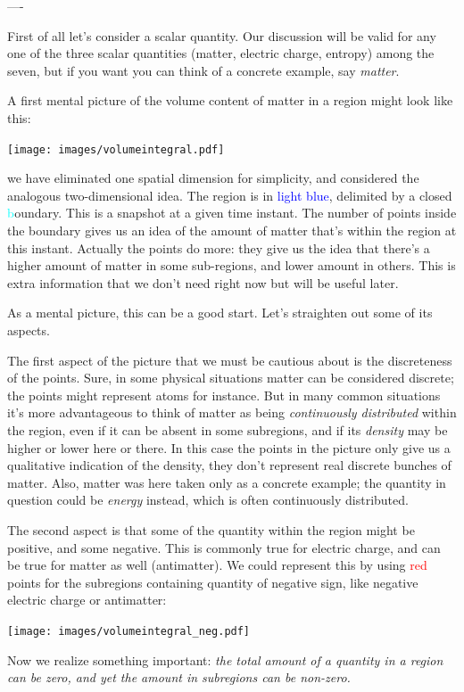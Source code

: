 ----



First of all let's consider a scalar quantity. Our discussion will be valid for any one of the three scalar quantities (matter, electric charge, entropy) among the seven, but if you want you can think of a concrete example, say \emph{matter}.

A first mental picture of the volume content of matter in a region might look like this:
\begin{center}
  \texttt{[image: images/volumeintegral.pdf]}
\end{center}
we have eliminated one spatial dimension for simplicity, and considered the analogous two-dimensional idea. The region is in \textcolor{blue}{light blue}, delimited by a closed \textcolor{cyan} boundary. This is a snapshot at a given time instant. The number of points inside the boundary gives us an idea of the amount of matter that's within the region at this instant. Actually the points do more: they give us the idea that there's a higher amount of matter in some sub-regions, and lower amount in others. This is extra information that we don't need right now but will be useful later.

As a mental picture, this can be a good start. Let's straighten out some of its aspects.

The first aspect of the picture that we must be cautious about is the discreteness of the points. Sure, in some physical situations matter can be considered discrete; the points might represent atoms for instance. But in many common situations it's more advantageous to think of matter as being \emph{continuously distributed} within the region, even if it can be absent in some subregions, and if its \emph{density} may be higher or lower here or there. In this case the points in the picture only give us a qualitative indication of the density, they don't represent real discrete bunches of matter. Also, matter was here taken only as a concrete example; the quantity in question could be \emph{energy} instead, which is often continuously distributed.

The second aspect is that some of the quantity within the region might be positive, and some negative. This is commonly true for electric charge, and can be true for matter as well (antimatter). We could represent this by using \textcolor{red}{red} points for the subregions containing quantity of negative sign, like negative electric charge or antimatter:
\begin{center}
  \texttt{[image: images/volumeintegral\_neg.pdf]}
\end{center}
Now we realize something important: \emph{the total amount of a quantity in a region can be zero, and yet the amount in subregions can be non-zero.}

